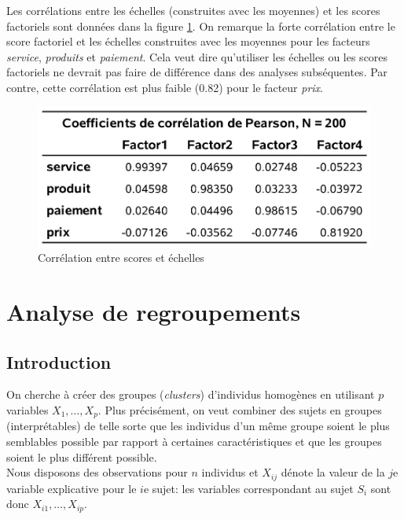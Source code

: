 \documentclass[
  11pt,
  letterpaper,
]{book}
\theoremstyle{definition}
\theoremstyle{definition}
\theoremstyle{definition}
\theoremstyle{remark}
\begin{document}
Les corrélations entre les échelles (construites avec les moyennes) et les scores factoriels sont données dans la figure \ref{fig:fig1p16}. On remarque la forte corrélation entre le score factoriel et les échelles construites avec les moyennes pour les facteurs \emph{service}, \emph{produits} et \emph{paiement}. Cela veut dire qu'utiliser les échelles ou les scores factoriels ne devrait pas faire de différence dans des analyses subséquentes. Par contre, cette corrélation est plus faible (0.82) pour le facteur \emph{prix}.

\begin{figure}

{\centering \includegraphics[width=0.65\linewidth]{figures/01-facto-e16} 

}

\caption{Corrélation entre scores et échelles}\label{fig:fig1p16}
\end{figure}

\hypertarget{analyse-regroupements}{%
\chapter{Analyse de regroupements}\label{analyse-regroupements}}

\hypertarget{introduction-2}{%
\section{Introduction}\label{introduction-2}}

On cherche à créer des groupes (\emph{clusters}) d'individus homogènes en utilisant \(p\) variables \(X_1, \ldots, X_p\). Plus précisément, on veut combiner des sujets en groupes (interprétables) de telle sorte que les individus d'un même groupe soient le plus semblables possible par rapport à certaines caractéristiques et que les groupes soient le plus différent possible.\\
Nous disposons des observations pour \(n\) individus et \(X_{ij}\) dénote la valeur de la \(j\)e variable explicative pour le \(i\)e sujet: les variables correspondant au sujet \(S_i\) sont donc \(X_{i1}, \ldots, X_{ip}\).
\end{document}
